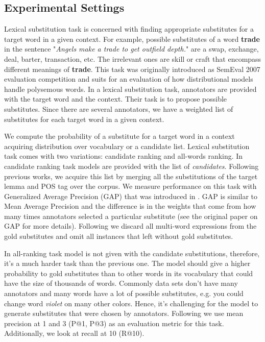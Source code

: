 \documentclass[11pt,a4paper]{article}
\begin{document}
\subsection{Experimental Settings}
Lexical substitution task is concerned with finding appropriate substitutes for a target word in a given context. For example, possible substitutes of a word {\bf trade} in the sentence "{\it Angels make a trade to get outfield depth.}" are a swap, exchange, deal, barter, transaction, etc. The irrelevant ones are skill or craft that encompass different meanings of {\bf trade}. This task was originally introduced as SemEval 2007 evaluation competition \cite{mccarthy-navigli-2007-semeval} and suits for an evaluation of how distributional models handle polysemous words. In a lexical substitution task, annotators are provided with the target word and the context. Their task is to propose possible substitutes. Since there are several annotators, we have a weighted list of substitutes for each target word in a given context. 

We compute the probability of a substitute for a target word in a context acquiring distribution over vocabulary or a candidate list. Lexical substitution task comes with two variations: candidate ranking and all-words ranking. In candidate ranking task models are provided with the list of {\it candidates}. Following previous works, we acquire this list by merging all the substitutions of the target lemma and POS tag over the corpus. We measure performance on this task with Generalized Average Precision (GAP) that was introduced in \cite{gap}. GAP is similar to Mean Average Precision and the difference is in the weights that come from how many times annotators selected a particular substitute (see the original paper on GAP for more details). Following \cite{melamud-etal-2015-modeling} we discard all multi-word expressions from the gold substitutes and omit all instances that left without gold substitutes. 

In all-ranking task model is not given with the candidate substitutions, therefore, it's a much harder task than the previous one. The model should give a higher probability to gold substitutes than to other words in its vocabulary that could have the size of thousands of words. Commonly data sets don't have many annotators and many words have a lot of possible substitutes, e.g. you could change word {\it violet} on many other colors. Hence, it's challenging for the model to generate substitutes that were chosen by annotators. Following \cite{pic} we use mean precision at 1 and 3 (P@1, P@3) as an evaluation metric for this task. Additionally, we look at recall at 10 (R@10).
\end{document}
